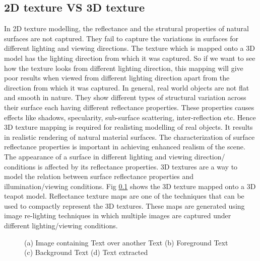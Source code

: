 \subsection{2D texture VS 3D texture}

In 2D texture modelling, the reflectance and the strutural properties of natural surfaces
are not captured. They fail to capture the variations in surfaces for different lighting and
viewing directions. The texture which is mapped onto a 3D model has
the lighting direction from which it was captured. So if we want to see how the texture looks from
different lighting direction, this mapping will give poor results when viewed from different
lighting direction apart from the direction from which it was captured. In general, real world objects
are not flat and smooth in nature. They show different types of structural variation across their
surface each having different reflectance properties. These properties causes effects like shadows,
specularity, sub-surface scattering, inter-reflection etc. Hence 3D texture mapping
is required for realisting modelling of real objects.
It results in realistic rendering
of natural material surfaces. The characterization of surface reflectance properties is important in
achieving enhanced realism of the scene. The appearance of a surface in different lighting and viewing direction/
conditions is affected by its reflectance properties.
3D textures are a way to model the relation between surface reflectance
properties and illumination/viewing conditions. Fig \ref{} shows the
3D texture mapped onto a 3D teapot model. Reflectance texture maps are one of
the techniques that can be used to compactly represent the 3D textures. These
maps are generated using image re-lighting techniques in which
multiple images are captured under different lighting/viewing conditions.


\begin{figure}[t]
\centering
{}
\caption
{(a) Image containing Text over another Text (b) Foreground Text (c) Background Text (d)
Text extracted}
\end{figure}



